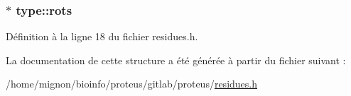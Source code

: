 \hypertarget{structtype_a57b235e8311e271142069e1267194adb}{
\subsubsection[{rots}]{$\ast$ type\+::rots}}\label{structtype_a57b235e8311e271142069e1267194adb}


Définition à la ligne 18 du fichier residues.\+h.



La documentation de cette structure a été générée à partir du fichier suivant \+:\begin{DoxyCompactItemize}
\item 
/home/mignon/bioinfo/proteus/gitlab/proteus/\hyperlink{residues_8h}{residues.\+h}\end{DoxyCompactItemize}
